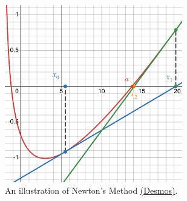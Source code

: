 \documentclass[../Notes.tex]{subfiles}
\begin{document}
    \begin{figure}[H]
        \centering
        \includegraphics[width=0.69\textwidth]{../Diagrams/newton's-method.pdf}
        \caption{An illustration of Newton's Method \href{https://www.desmos.com/calculator/izkg4ynlfp}{(Desmos)}.}
        \label{fig:newton's-method}
    \end{figure}
\end{document}
